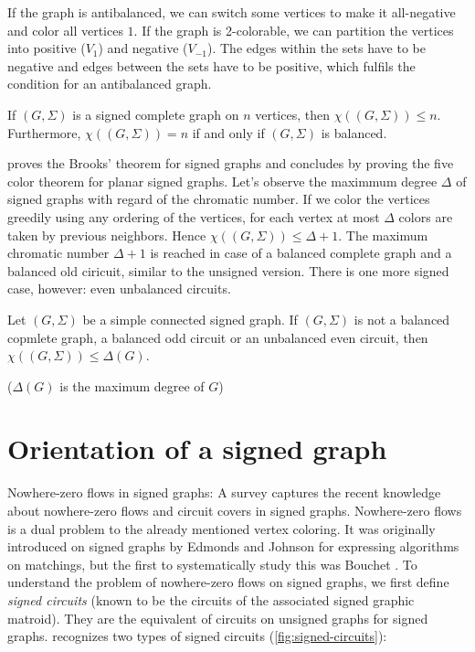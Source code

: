 If the graph is antibalanced, we can switch some vertices to make it all-negative and color all vertices $1$.
If the graph is 2-colorable, we can partition the vertices into positive ($V_1$) and negative ($V_{-1}$).
The edges within the sets have to be negative and edges between the sets have to be positive, which fulfils the condition for an antibalanced graph.

\begin{proposition}[Máčajová et. al.]
    If $(G, \Sigma)$ is a signed complete graph on $n$ vertices, then $\chi ((G, \Sigma)) \leq n$. 
    Furthermore, $\chi ((G, \Sigma)) = n$ if and only if $(G, \Sigma)$ is balanced.
\end{proposition}

\cite{chromatic-number} proves the Brooks' theorem\cite{brooks} for signed graphs and concludes by proving the five color theorem for planar signed graphs.
Let's observe the maximmum degree $\Delta$ of signed graphs with regard of the chromatic number.
If we color the vertices greedily using any ordering of the vertices, for each vertex at most
$\Delta$ colors are taken by previous neighbors. Hence $\chi ((G, \Sigma)) \leq \Delta + 1$. 
The maximum chromatic number $\Delta + 1$ is reached in case of a balanced complete graph and
a balanced old ciricuit, similar to the unsigned version. There is one more signed case, however: even unbalanced circuits.

\begin{theorem}[Máčajová et. al.]
    Let $(G, \Sigma)$ be a simple connected signed graph. If $(G, \Sigma)$ is not a balanced copmlete graph,
    a balanced odd circuit or an unbalanced even circuit, then $\chi ((G, \Sigma)) \leq \Delta (G)$.
\end{theorem}

($\Delta (G)$ is the maximum degree of $G$)

\section{Orientation of a signed graph}

Nowhere-zero flows in signed graphs: A survey\cite{nowhere-zero-flows-survey} captures the recent knowledge about nowhere-zero flows and circuit covers in signed graphs.
Nowhere-zero flows is a dual problem to the already mentioned vertex coloring. 
It was originally introduced on signed graphs by Edmonds and Johnson\cite{edmonds-johnson} for expressing algorithms on matchings, but the first to systematically study this was Bouchet \cite{bouchet-flows}.
To understand
the problem of nowhere-zero flows on signed graphs, we first define \textit{signed circuits} (known to be the circuits of the associated signed graphic matroid). 
They are the equivalent of circuits on unsigned graphs for signed graphs. \cite{nowhere-zero-flows-survey} recognizes two types of signed circuits (\cref{fig:signed-circuits}):

